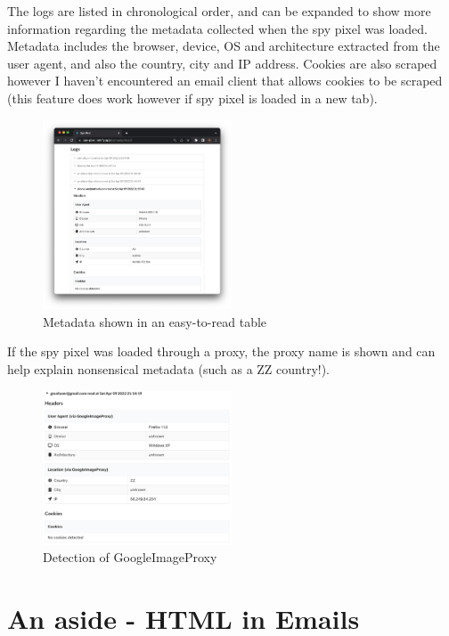 \documentclass{article}
\begin{document}
The logs are listed in chronological order, and can be expanded to show more information regarding the metadata collected when the spy pixel was loaded. Metadata includes the browser, device, OS and architecture extracted from the user agent, and also the country, city and IP address. Cookies are also scraped however I haven't encountered an email client that allows cookies to be scraped (this feature does work however if spy pixel is loaded in a new tab).

\begin{figure}[H]
\centering
\includegraphics[width=0.5\textwidth]{images/logs.png}
\caption{Metadata shown in an easy-to-read table}
\end{figure}

If the spy pixel was loaded through a proxy, the proxy name is shown and can help explain nonsensical metadata (such as a ZZ country!).

\begin{figure}[H]
\centering
\includegraphics[width=0.5\textwidth]{images/gmailproxy.png}
\caption{Detection of GoogleImageProxy}
\end{figure}

\section{An aside - HTML in Emails}
\end{document}
